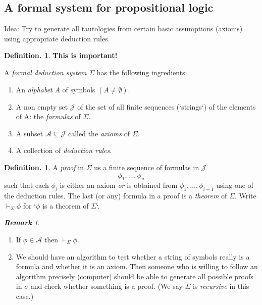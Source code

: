 \documentclass[a4paper,oneside,11pt,DIV=12,parskip=half]{scrartcl}
\theoremstyle{plain}
\theoremstyle{definition}
\newtheorem{definition}[theorem]{Definition.}
\newtheorem{remark, definition}[theorem]{Remark and Definition.}
\newtheorem{lemma, definition}[theorem]{Lemma and Definition.}
\newtheorem{theorem, definition}[theorem]{Theorem and Definition.}
\theoremstyle{remark}
\newtheorem*{remark}{\textbf{Remark}}
\newtheorem*{remark, example}{\textbf{Remark and Exercise}}
\begin{document}
\subsection{A formal system for propositional logic}

Idea: Try to generate all tautologies from certain basic assumptions (axioms) using appropriate deduction rules.

\begin{definition}
\textbf{This is important!}

A \emph{formal deduction system} $\Sigma$ has the following ingredients:
\begin{enumerate}
    \item An \emph{alphabet} $A$ of symbols $(A \neq \emptyset)$.
    \item A non empty set $\mathcal{J}$ of the set of all finite sequences (`strings`) of the elements of A: the \emph{formulas} of $\Sigma$.
    \item A subset $\mathcal{A} \subseteq \mathcal{J}$ called the \emph{axioms} of $\Sigma$. 
    \item A collection of \emph{deduction rules}.
\end{enumerate}
\end{definition}

\begin{definition}
A \emph{proof} in $\Sigma$ us a finite sequence of formulas in $\mathcal{J}$ \[ \phi_1,\dots,\phi_n \] such that each $ \phi_i $ is either an axiom \emph{or} is obtained from $ \phi_1, \dots, \phi_{i-1} $ using one of the deduction rules. The last (or any) formula in a proof is a \emph{theorem} of $\Sigma$.
Write $\vdash_\Sigma \phi$ for `$\phi$ is a theorem of $\Sigma$`. 
\end{definition}

\begin{remark}
\begin{enumerate}
    \item If $\phi \in \mathcal{A}$ then $\vdash_\Sigma \phi$.
    \item We should have an algorithm to test whether a string of symbols really is a formula and whether it is an axiom. Then someone who is willing to follow an algorithm precisely (computer) should be able to generate all possible proofs in $\sigma$ and check whether something is a proof. (We say $\Sigma$ is \emph{recursive} in this case.)
\end{enumerate}
\end{remark}
\end{document}
